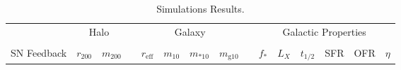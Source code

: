 \begin{table*}
\centering
\caption{Simulations Results.}
\label{table:results}
\begin{threeparttable}
\begin{tabular}{@{\ \ }l@{\ \ \ }c@{ \ }c@{\ \ }c@{\ \ \ \ \ }c@{ \ }c@{ \ }c@{ \ }c@{\ \ }c@{\ \ \ \ \ }c@{ \ }c@{ \ }c@{ \ }c@{\ \ \ }c@{\ \ \ }c@{\ \ }}
\hline\hline
 & \multicolumn{2}{c}{Halo} & & \multicolumn{4}{c}{Galaxy} & & \multicolumn{6}{c}{Galactic Properties}\\
 & \multicolumn{2}{c}{\hrulefill} & & \multicolumn{4}{c}{\hrulefill} & & \multicolumn{6}{c}{\hrulefill} \\
SN Feedback &
$r_{\mathrm{200}}$ \tnote {a} &
$m_{\mathrm{200}}$ \tnote{b} & &
$r_{\mathrm{eff}}$ \tnote{c} &
$m_{\mathrm{10}}$ \tnote{d} &
$m_{\mathrm{*10}}$ \tnote{e} &
$m_{\mathrm{g10}}$ \tnote{f} & &
$f_{\mathrm{*}}$ \tnote{g} &
$L_X$ \tnote{h} &
$t_{1/2}$ \tnote{i} &
SFR \tnote{j} &
OFR \tnote{k} &
$\eta$ \tnote{l} \\


\end{tabular}
\end{threeparttable}
\end{table*}
